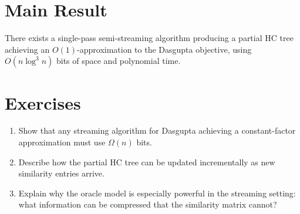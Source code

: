 \section{Main Result}

\begin{theorem}
\label{thm:streaming}
There exists a single-pass semi-streaming algorithm producing a partial HC tree achieving an $O(1)$-approximation to the Dasgupta objective, using $O(n\log^3 n)$ bits of space and polynomial time.
\end{theorem}

\section{Exercises}

\begin{enumerate}
  \item Show that any streaming algorithm for Dasgupta achieving a constant-factor approximation must use $\Omega(n)$ bits.
  \item Describe how the partial HC tree can be updated incrementally as new similarity entries arrive.
  \item Explain why the oracle model is especially powerful in the streaming setting: what information can be compressed that the similarity matrix cannot?
\end{enumerate}

